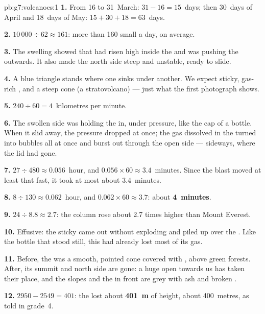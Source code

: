 \begin{solution}{pb:g7:volcanoes:1}
\textbf{1.} From 16 to 31~March: $31 - 16 = 15$~days; then 30~days of
April and 18~days of May: $15 + 30 + 18 = 63$~days.

\textbf{2.} $10\,000 \div 62 \approx 161$: more than 160 small
 a day, on average.

\textbf{3.} The swelling showed that  had risen high inside the
 and was pushing the  outwards. It also made the north side
steep and unstable, ready to slide.

\textbf{4.} A blue triangle stands where one  sinks under another. We
expect sticky, gas-rich ,  and a steep cone (a
stratovolcano) --- just what the first photograph shows.

\textbf{5.} $240 \div 60 = 4$~kilometres per minute.

\textbf{6.} The swollen side was holding the  in, under pressure,
like the cap of a bottle. When it slid away, the pressure dropped at
once; the gas dissolved in the  turned into bubbles all at once and
burst out through the open side --- sideways, where the lid had gone.

\textbf{7.} $27 \div 480 \approx 0.056$~hour, and $0.056 \times 60 \approx
3.4$~minutes. Since the blast moved at least that fast, it took at most
about 3.4~minutes.

\textbf{8.} $8 \div 130 \approx 0.062$~hour, and $0.062 \times 60 \approx
3.7$: about \textbf{4~minutes}.

\textbf{9.} $24 \div 8.8 \approx 2.7$: the column rose about 2.7 times
higher than Mount Everest.

\textbf{10.} Effusive: the sticky  came out without exploding and piled
up over the . Like the bottle that stood still, this  had already
lost most of its gas.

\textbf{11.} Before, the  was a smooth, pointed cone covered with
, above green forests. After, its summit and north side are gone: a
huge  open towards us has taken their place, and the slopes and the
 in front are grey with ash and broken .

\textbf{12.} $2950 - 2549 = 401$: the  lost about
\textbf{401~m} of height, about 400~metres, as told in grade~4.
\end{solution}
